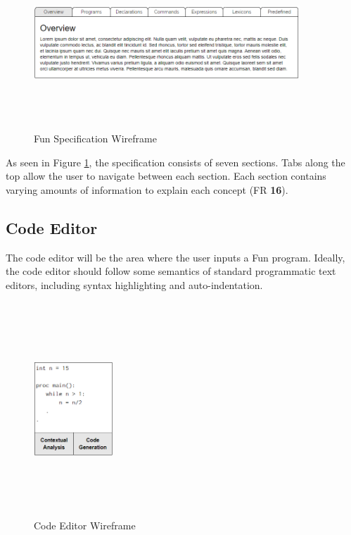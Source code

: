 \documentclass{l4proj}
\begin{document}
\begin{figure}[h]
\centering
\includegraphics[height=6.5cm,width=10cm]{images/specification-wireframe.png}
\caption{Fun Specification Wireframe}
\label{fig:fun-specification-wireframe}	
\end{figure}

As seen in Figure \ref{fig:fun-specification-wireframe}, the specification consists of seven sections. Tabs along the top allow the user to navigate between each section. Each section contains varying amounts of information to explain each concept (FR \textbf{16}).

\pagebreak
\subsection{Code Editor}
The code editor will be the area where the user inputs a Fun program. Ideally, the code editor should follow some semantics of standard programmatic text editors, including syntax highlighting and auto-indentation. 

\begin{figure}[h]
\centering
\includegraphics[height=8cm,width=3cm]{images/code-editor-wireframe.png}
\caption{Code Editor Wireframe}
\label{fig:code-editor-wireframe}	
\end{figure}
\end{document}
